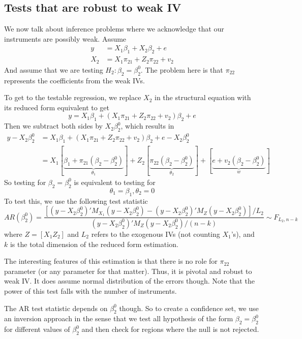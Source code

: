 \documentclass[12pt]{article}
\theoremstyle{definition}
\theoremstyle{property}
\theoremstyle{assumption}
\theoremstyle{example}
\theoremstyle{comment}
\begin{document}
\subsection{Tests that are robust to weak IV}
We now talk about inference problems where we acknowledge that our instruments are possibly weak.  Assume
\[
\begin{aligned}
y &=X_1\beta_1+ X_2\beta_2+e\\
X_2&=X_1\pi_{21}+Z_2\pi_{22} + v_2
\end{aligned}
\]
And assume that we are testing $H_2: \beta_2=\beta_2^0$. The problem here is that $\pi_{22}$ represents the coefficients from the weak IVs.\par

To get to the testable regression, we replace $X_2$ in the structural equation with its reduced form equivalent to get
\[
y = X_1\beta_1+ (X_1\pi_{21}+Z_2\pi_{22} + v_2)\beta_2+e
\]
Then we subtract both sides by $X_2\beta_2^0$, which results in
\[
\begin{aligned}
y-X_2\beta_2^0 &=X_1\beta_1+ (X_1\pi_{21}+Z_2\pi_{22} + v_2)\beta_2+e - X_2\beta_2^0\\
&=X_1[\underbrace{\beta_1 +\pi_{21}(\beta_2-\beta_2^0)}_{\theta_1}] + Z_2[\underbrace{\pi_{22}(\beta_2-\beta_2^0)}_{\theta_2}]+[\underbrace{e+v_2(\beta_2-\beta_2^0)}_{w}]
\end{aligned}
\]
So testing for $\beta_2=\beta_2^0$ is equivalent to testing for
\[
\theta_1= \beta_1, \theta_2 = 0
\]
To test this, we use the following test statistic
\[
AR(\beta_2^0)=\frac{[(y-X_2\beta_2^0)'M_{X_1}(y-X_2\beta_2^0)-(y-X_2\beta_2^0)'M_{Z}(y-X_2\beta_2^0)]/L_2}{(y-X_2\beta_2^0)'M_{Z}(y-X_2\beta_2^0)/ (n-k)} \sim F_{L_2, n-k}
\]
where $Z=[X_1 Z_2]$ and $L_2$ refers to the exogenous IVs (not counting $X_1$'s), and $k$ is the total dimension of the reduced form estimation.
\par

The interesting features of this estimation is that there is no role for $\pi_{22}$ parameter (or any parameter for that matter). Thus, it is pivotal and robust to weak IV. It does assume normal distribution of the errors though. Note that the power of this test falls with the number of instruments.
\par
The AR test statistic depends on $\beta_2^0$ though. So to create a confidence set, we use an inversion approach in the sense that we test all hypothesis of the form $\beta_2= \beta_2^0$ for different values of $\beta_2^0$ and then check for regions where the null is not rejected. 
\par
\end{document}
